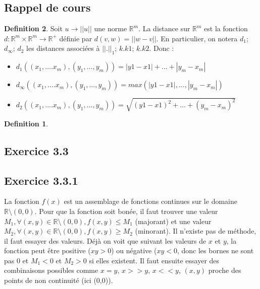 \documentclass[]{book}
\theoremstyle{definition}
\newtheorem{defn}{Definition}
\newcommand{\bb}[1]{\mathbb{#1}}
\newcommand{\R}{\bb{R}}
\begin{document}
\subsection*{Rappel de cours}

\begin{defn}
Soit $u \to ||u||$ une norme $\R^m$. La distance sur $\R^m$ est la fonction $d : \R^m \times \R^m \to  \R^+$ d\'efinie par $d(v,w) = ||w - v||$.
En particulier, on notera $d_1$; $d_{\infty}$; $d_2$ les distances associées à $|| . ||_1$; $k . k1$; $k . k2$. Donc :
\begin{itemize}
\item $d_1((x_1, \ldots. x_m), (y_1, \ldots, y_m)) = |y1 - x1| + \ldots + |y_m - x_m|$
\item $d_{\infty}((x_1, \ldots. x_m), (y_1, \ldots, y_m)) = max(|y1 - x1|, \ldots, |y_m - x_m|)$
\item $d_2((x_1, \ldots. x_m), (y_1, \ldots, y_m)) = \sqrt{(y1 - x1)^2 + \ldots + (y_m - x_m)^2}$
\end{itemize}

\begin{defn}
\end{defn}



\end{defn}



\newpage
\subsection*{Exercice 3.3}
\subsection*{Exercice 3.3.1}
La fonction $f(x)$ est un assemblage de fonctions continues sur le domaine $\R\setminus (0,0)$. Pour que la fonction soit bon\'ee, il faut trouver une valeur $M_1, \forall(x,y) \in \R\setminus (0,0), f(x,y) \leq M_1$ (majorant) et une valeur $M_2, \forall(x,y) \in \R\setminus (0,0), f(x,y) \geq M_2$ (minorant). Il n'existe pas de m\'ethode, il faut essayer des valeurs. D\'ej\`a on voit que suivant les valeurs de $x$ et $y$, la fonction peut \^etre positive ($xy > 0$) ou n\'egative ($xy<0$, donc les bornes ne sont pas 0 et $M_1 < 0$ et $M_2 > 0$ si elles existent. Il faut ensuite essayer des combinaisons possibles comme $x=y$, $x >> y$, $x << y$, $(x,y)$ proche des points de non continuit\'e (ici (0,0)).\\
\end{document}
